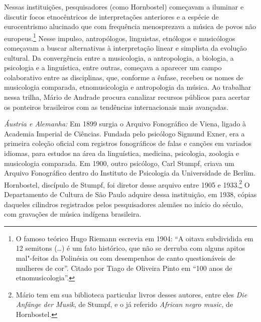 Nessas instituições, pesquisadores (como Hornbostel) começavam a
iluminar e discutir focos etnocêntricos de interpretações anteriores e a
espécie de eurocentrismo alucinado que com frequência menosprezava a
música de povos não europeus.\footnote{O famoso teórico Hugo Riemann
  escrevia em 1904: ``A oitava subdividida em 12 semitons (\ldots{}) é um
  fato histórico, que não se derruba com alguns apitos mal"-feitos da
  Polinésia ou com desempenhos de canto questionáveis de mulheres de
  cor''. Citado por Tiago de Oliveira Pinto em ``100 anos de
  etnomusicologia''.} Nesse impulso, antropólogos, linguistas, etnólogos
e musicólogos começavam a buscar alternativas à interpretação linear e
simplista da evolução cultural. Da convergência entre a musicologia, a
antropologia, a biologia, a psicologia e a linguística, entre outras,
começava a aparecer um campo colaborativo entre as disciplinas, que,
conforme a ênfase, recebeu os nomes de musicologia comparada,
etnomusicologia e antropologia da música. Ao trabalhar nessa trilha,
Mário de Andrade procura canalizar recursos públicos para acertar os
ponteiros brasileiros com as tendências internacionais mais avançadas.

\emph{Áustria e Alemanha:} Em 1899 surgia o Arquivo Fonográfico de
Viena, ligado à Academia Imperial de Ciências. Fundada pelo psicólogo
Sigmund Exner, era a primeira coleção oficial com registros fonográficos
de falas e canções em variados idiomas, para estudos na área da
linguística, medicina, psicologia, zoologia e musicologia comparada. Em
1900, outro psicólogo, Carl Stumpf, criava um Arquivo Fonográfico dentro
do Instituto de Psicologia da Universidade de Berlim. Hornbostel,
discípulo de Stumpf, foi diretor desse arquivo entre 1905 e
1933.\footnote{Mário tem em sua biblioteca particular livros desses
  autores, entre eles \emph{Die Anfänge der Musik}, de Stumpf, e o já
  referido \emph{African negro music,} de Hornbostel.} O Departamento de
Cultura de São Paulo adquire dessa instituição, em 1938, cópias daqueles
cilindros registrados pelos pesquisadores alemães no início do século,
com gravações de música indígena brasileira.


